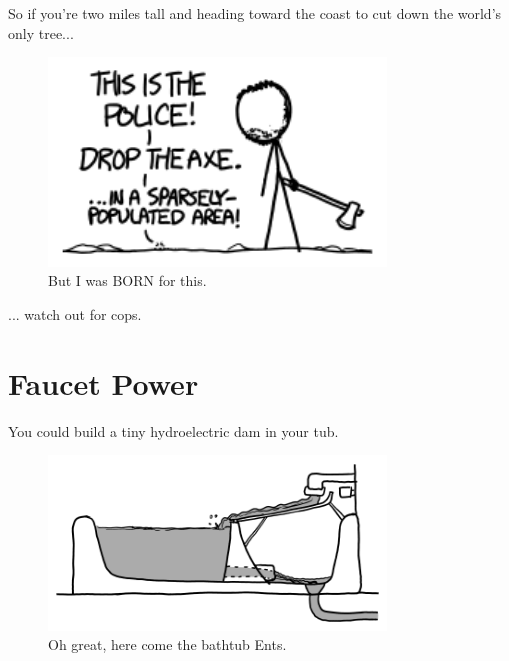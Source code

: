 {{So if you're two miles tall and heading toward the coast to cut down the world's only tree...}

\begin{figure}[!htbp]
\centering
\includegraphics[scale=0.5, max width=0.8\textwidth]{imgs/a/90/ygg_bike.png}
\caption{But I was BORN for this.}
\end{figure}

{... watch out for cops.}

{
\chapter{Faucet Power}
}

\hfill{}

{You could build a tiny hydroelectric dam in your tub.}

\begin{figure}[!htbp]
\centering
\includegraphics[scale=0.5, max width=0.8\textwidth]{imgs/a/91/faucet_bath.png}
\caption{Oh great, here come the bathtub Ents.}
\end{figure}

}
